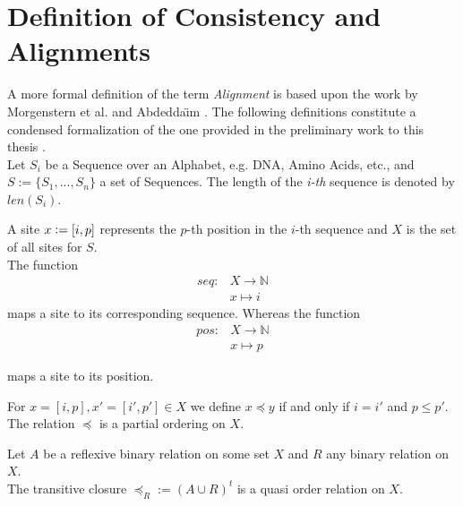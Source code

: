 \section{Definition of Consistency and Alignments}
\label{sec:consistency}
A more formal definition of the term \textit{Alignment} is based upon the work by Morgenstern et al. \cite{morgenstern1996multiple} and Abdedda{\"\i}m \cite{abdeddaim2000speeding}. The following definitions constitute a condensed formalization of the one provided in the preliminary work to this thesis \cite{hundt2020praktkium}.\\ 

Let $S_i$ be a Sequence over an Alphabet, e.g. DNA, Amino Acids, etc., and $S := \{S_1, ..., S_n\}$ a set of Sequences. The length of the \textit{i-th} sequence is denoted by $len(S_i)$.\\

\begin{mydef}[Site]
	A site $x \vcentcolon= [i,p]$ represents the $p$-th position in the $i$-th sequence and $X$ is the set of all sites for $S$.\\
	The function 
	\begin{align*}
	seq: &X \rightarrow \mathbb{N}\\
	&x \mapsto i
	\end{align*}
	maps a site to its corresponding sequence. Whereas the function
	\begin{align*}
	pos: &X \rightarrow \mathbb{N}\\
	&x \mapsto p
	\end{align*}
\end{mydef}
maps a site to its position.
\begin{mydef}
	For $x = [i, p], x'=[i', p'] \in X$ we define $x \preceq y$ if and only if $i = i'$ and $p \leq p'$.\\
	The relation $\preceq$ is a partial ordering on $X$.
\end{mydef}


\begin{mylemma}
	Let $A$ be a reflexive binary relation on some set $X$ and $R$ any binary relation on $X$.\\
	The transitive closure $\preceq_R :=(A\cup R)^t$ is a quasi order relation on $X$.\\
	\label{lem:extension-quasiorder}
\end{mylemma}


